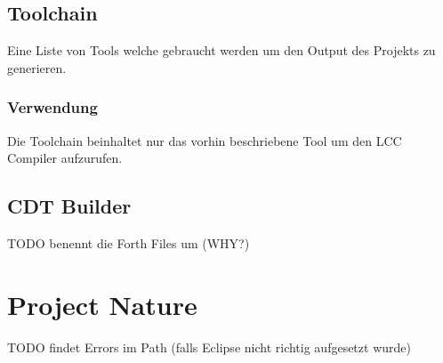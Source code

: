 \subsection{Toolchain}
Eine Liste von Tools welche gebraucht werden um den Output des Projekts zu generieren. 

\subsubsection{Verwendung}
Die Toolchain beinhaltet nur das vorhin beschriebene Tool um den LCC Compiler aufzurufen.

\subsection{CDT Builder}

TODO benennt die Forth Files um (WHY?)

\section{Project Nature}

TODO findet Errors im Path (falls Eclipse nicht richtig aufgesetzt wurde)
